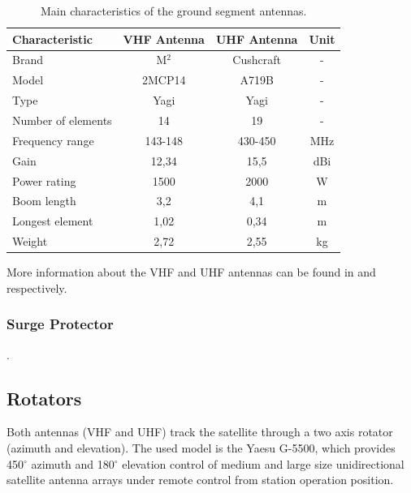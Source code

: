 \begin{table}[ht]
    \centering
    \begin{tabular}{lccc}
        \toprule[1.5pt]
        \textbf{Characteristic} & \textbf{VHF Antenna}  & \textbf{UHF Antenna}  & \textbf{Unit} \\
        \midrule
        Brand                   & M$^{2}$               & Cushcraft             & - \\
        Model                   & 2MCP14                & A719B                 & - \\
        Type                    & Yagi                  & Yagi                  & - \\
        Number of elements      & 14                    & 19                    & - \\
        Frequency range         & 143-148               & 430-450               & MHz \\
        Gain                    & 12,34                 & 15,5                  & dBi \\
        Power rating            & 1500                  & 2000                  & W \\
        Boom length             & 3,2                   & 4,1                   & m \\
        Longest element         & 1,02                  & 0,34                  & m \\
        Weight                  & 2,72                  & 2,55                  & kg \\
        \bottomrule[1.5pt]
    \end{tabular}
    \caption{Main characteristics of the ground segment antennas.}
    \label{tab:grs-antennas}
\end{table}

More information about the VHF and UHF antennas can be found in \cite{2mcp14} and \cite{a719b} respectively.

\subsubsection{Surge Protector}

.

\subsection{Rotators}

Both antennas (VHF and UHF) track the satellite through a two axis rotator (azimuth and elevation). The used model is the Yaesu G-5500, which provides 450$^{\circ}$ azimuth and 180$^{\circ}$ elevation control of medium and large size unidirectional satellite antenna arrays under remote control from station operation position.

